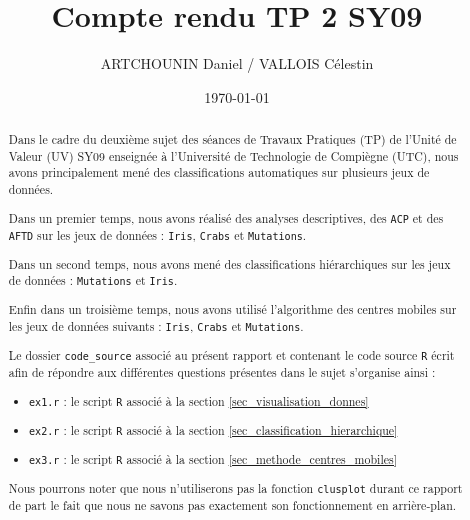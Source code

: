 \documentclass{article}
\title{Compte rendu TP 2 SY09}
\author{ARTCHOUNIN Daniel / VALLOIS Célestin}
\date{\today}
\begin{document}
\maketitle %

\thispagestyle{fancy} %



\begin{abstract}

Dans le cadre du deuxième sujet des séances de Travaux Pratiques (TP) de l'Unité de Valeur (UV) SY09 enseignée à l'Université de Technologie de Compiègne (UTC), nous avons principalement mené des classifications automatiques sur plusieurs jeux de données.

Dans un premier temps, nous avons réalisé des analyses descriptives, des \texttt{ACP} et des \texttt{AFTD} sur les jeux de données : \texttt{Iris}, \texttt{Crabs} et \texttt{Mutations}.

Dans un second temps, nous avons mené des classifications hiérarchiques sur les jeux de données : \texttt{Mutations} et \texttt{Iris}.

Enfin dans un troisième temps, nous avons utilisé l'algorithme des centres mobiles sur les jeux de données suivants : \texttt{Iris}, \texttt{Crabs} et \texttt{Mutations}.

Le dossier \texttt{code\_source} associé au présent rapport et contenant le code source \texttt{R} écrit afin de répondre aux différentes questions présentes dans le sujet s'organise ainsi : 

\begin{itemize}
  \item \texttt{ex1.r} : le script \texttt{R} associé à la section \ref{sec_visualisation_donnes}
  \item \texttt{ex2.r} : le script \texttt{R} associé à la section \ref{sec_classification_hierarchique}
  \item \texttt{ex3.r} :  le script \texttt{R} associé à la section \ref{sec_methode_centres_mobiles}
\end{itemize}
Nous pourrons noter que nous n'utiliserons pas la fonction \texttt{clusplot} durant ce rapport de part le fait que nous ne savons pas exactement son fonctionnement en arrière-plan.
\end{abstract}

\end{document}
